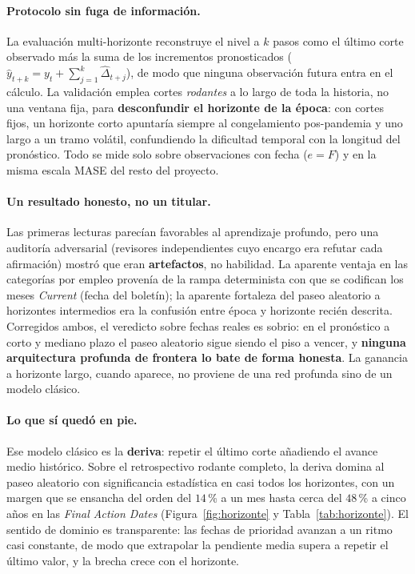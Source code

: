 \documentclass[12pt,letterpaper]{report}
\begin{document}
\paragraph{Protocolo sin fuga de información.} La evaluación multi-horizonte reconstruye el nivel
a $k$ pasos como el último corte observado más la suma de los incrementos pronosticados
($\hat{y}_{t+k}=y_t+\sum_{j=1}^{k}\widehat{\Delta}_{t+j}$), de modo que ninguna observación futura
entra en el cálculo. La validación emplea cortes \textit{rodantes} a lo largo de toda la historia,
no una ventana fija, para \textbf{desconfundir el horizonte de la época}: con cortes fijos, un
horizonte corto apuntaría siempre al congelamiento pos-pandemia y uno largo a un tramo volátil,
confundiendo la dificultad temporal con la longitud del pronóstico. Todo se mide solo sobre
observaciones con fecha ($e=F$) y en la misma escala MASE del resto del proyecto.

\paragraph{Un resultado honesto, no un titular.} Las primeras lecturas parecían favorables al
aprendizaje profundo, pero una auditoría adversarial (revisores independientes cuyo encargo era
refutar cada afirmación) mostró que eran \textbf{artefactos}, no habilidad. La aparente ventaja
en las categorías por empleo provenía de la rampa determinista con que se codifican los meses
\textit{Current} (fecha del boletín); la aparente fortaleza del paseo aleatorio a horizontes
intermedios era la confusión entre época y horizonte recién descrita. Corregidos ambos, el
veredicto sobre fechas reales es sobrio: en el pronóstico a corto y mediano plazo el paseo
aleatorio sigue siendo el piso a vencer, y \textbf{ninguna arquitectura profunda de frontera lo
bate de forma honesta}. La ganancia a horizonte largo, cuando aparece, no proviene de una red
profunda sino de un modelo clásico.

\paragraph{Lo que sí quedó en pie.} Ese modelo clásico es la \textbf{deriva}: repetir el último
corte añadiendo el avance medio histórico. Sobre el retrospectivo rodante completo, la deriva
domina al paseo aleatorio con significancia estadística en casi todos los horizontes, con un
margen que se ensancha del orden del $14$\,\% a un mes hasta cerca del $48$\,\% a cinco años en
las \textit{Final Action Dates} (Figura~\ref{fig:horizonte} y Tabla~\ref{tab:horizonte}). El
sentido de dominio es transparente: las fechas de prioridad avanzan a un ritmo casi constante, de
modo que extrapolar la pendiente media supera a repetir el último valor, y la brecha crece con el
horizonte.
\end{document}
